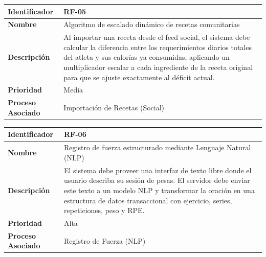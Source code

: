 \documentclass[12pt]{article}
\begin{document}
\begin{table}[h!]
    \centering
    \renewcommand{\arraystretch}{1.3}
    \begin{tabular}{|p{3.5cm}|p{11.5cm}|}
        \hline
        \rowcolor[HTML]{EFEFEF} 
        \textbf{Identificador} & \textbf{RF-05} \\ \hline
        \textbf{Nombre} & Algoritmo de escalado dinámico de recetas comunitarias \\ \hline
        \textbf{Descripción} & Al importar una receta desde el feed social, el sistema debe calcular la diferencia entre los requerimientos diarios totales del atleta y sus calorías ya consumidas, aplicando un multiplicador escalar a cada ingrediente de la receta original para que se ajuste exactamente al déficit actual. \\ \hline
        \textbf{Prioridad} & Media \\ \hline
        \textbf{Proceso Asociado} & Importación de Recetas (Social) \\ \hline
    \end{tabular}
\end{table}

\begin{table}[h!]
    \centering
    \renewcommand{\arraystretch}{1.3}
    \begin{tabular}{|p{3.5cm}|p{11.5cm}|}
        \hline
        \rowcolor[HTML]{EFEFEF} 
        \textbf{Identificador} & \textbf{RF-06} \\ \hline
        \textbf{Nombre} & Registro de fuerza estructurado mediante Lenguaje Natural (NLP) \\ \hline
        \textbf{Descripción} & El sistema debe proveer una interfaz de texto libre donde el usuario describa su sesión de pesas. El servidor debe enviar este texto a un modelo NLP y transformar la oración en una estructura de datos transaccional con ejercicio, series, repeticiones, peso y RPE. \\ \hline
        \textbf{Prioridad} & Alta \\ \hline
        \textbf{Proceso Asociado} & Registro de Fuerza (NLP) \\ \hline
    \end{tabular}
\end{table}
\end{document}
